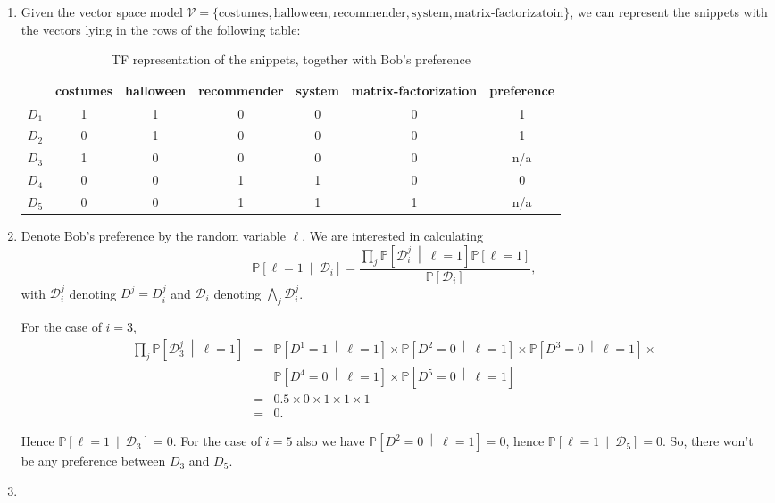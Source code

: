 \documentclass[DIN, pagenumber=false, fontsize=11pt, parskip=half]{scrartcl}
\newcommand{\prob}[1]{\mathbb{P}\left[ #1 \right]}
\newcommand{\probm}[2]{\mathbb{P}\left[ #1 ~\middle|~ #2 \right]}
\newcommand{\D}{\mathcal{D}}
\begin{document}
\begin{enumerate}[label=(\alph*)]

\item %
Given the vector space model $\mathcal{V} = \{\mathrm{costumes}, \mathrm{halloween}, \mathrm{recommender}, \mathrm{system}, \mbox{matrix-factorizatoin}\}$, we can represent the snippets with the vectors lying in the rows of the following table:

\begin{table}[htb]
\centering
\label{tab:bob-and-5}
\begin{tabular}{|l|ccccc|c|}
\hline
   & costumes & halloween & recommender & system & matrix-factorization & preference \\
   \hline \hline
   $D_1$ & 1 & 1 & 0 & 0 & 0 & 1 \\
   $D_2$ & 0 & 1 & 0 & 0 & 0 & 1 \\
   $D_3$ & 1 & 0 & 0 & 0 & 0 & n/a \\
   $D_4$ & 0 & 0 & 1 & 1 & 0 & 0 \\
   $D_5$ & 0 & 0 & 1 & 1 & 1 & n/a \\
   \hline
\end{tabular}
\caption{TF representation of the snippets, together with Bob's preference}
\end{table}

\item %
Denote Bob's preference by the random variable $\ell$. We are interested in calculating
\[
\probm{\ell = 1}{\D_i} = \frac{\prod_j \probm{\D_i^j}{\ell = 1}\prob{\ell = 1}}{\prob{\D_i}},
\]
with $\D_i^j$ denoting $D^j = D_i^j$ and $\D_i$ denoting $\bigwedge_j \D_i^j$.

For the case of $i=3$,
\begin{eqnarray*}
\prod_j \probm{\D_3^j}{\ell = 1} &=& \probm{D^1 = 1}{\ell = 1} \times \probm{D^2 = 0}{\ell = 1} \times \probm{D^3 = 0}{\ell = 1} \times \\
&& \probm{D^4 = 0}{\ell = 1} \times \probm{D^5 = 0}{\ell = 1} \\
&=& 0.5 \times 0 \times 1 \times 1 \times 1 \\
&=& 0.
\end{eqnarray*}

Hence $\probm{\ell = 1}{\D_3} = 0$. For the case of $i = 5$ also we have $\probm{D^2 = 0}{\ell=1} = 0$, hence $\probm{\ell = 1}{\D_5} = 0$. So, there won't be any preference between $D_3$ and $D_5$.

\item %


\end{enumerate}
\end{document}
